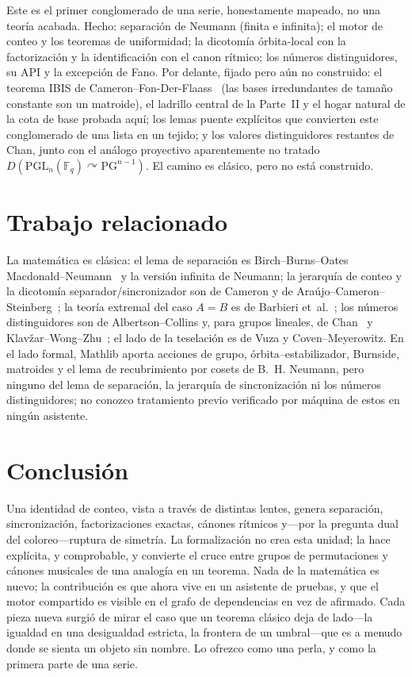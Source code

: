 \documentclass[11pt]{article}
\begin{document}
Este es el primer conglomerado de una serie, honestamente mapeado, no una teoría
acabada. Hecho: separación de Neumann (finita e infinita); el motor de conteo y los
teoremas de uniformidad; la dicotomía órbita-local con la factorización y la
identificación con el canon rítmico; los números distinguidores, su API y la excepción
de Fano. Por delante, fijado pero aún no construido: el teorema IBIS de
Cameron--Fon-Der-Flaass~\cite{CFF1995} (las bases irredundantes de tamaño constante son
un matroide), el ladrillo central de la Parte~II y el hogar natural de la cota de base
probada aquí; los lemas puente explícitos que convierten este conglomerado de una lista
en un tejido; y los valores distinguidores restantes de Chan, junto con el análogo
proyectivo aparentemente no tratado $D(\mathrm{PGL}_n(\mathbb{F}_q)\curvearrowright
\mathrm{PG}^{n-1})$. El camino es clásico, pero no está construido.

\section{Trabajo relacionado}
\label{sec:related}

La matemática es clásica: el lema de separación es Birch--Burns--Oates
Macdonald--Neumann~\cite{BBMN1976} y la versión infinita de Neumann; la jerarquía de
conteo y la dicotomía separador/sincronizador son de Cameron y de
Araújo--Cameron--Steinberg~\cite{ACS2017}; la teoría extremal del caso $A=B$ es de
Barbieri et~al.~\cite{Barbieri2025}; los números distinguidores son de
Albertson--Collins y, para grupos lineales, de Chan~\cite{Chan2006} y
Klavžar--Wong--Zhu~\cite{KWZ2006}; el lado de la teselación es de Vuza y
Coven--Meyerowitz. En el lado formal, Mathlib aporta acciones de grupo,
órbita--estabilizador, Burnside, matroides y el lema de recubrimiento por cosets de
B.~H. Neumann, pero ninguno del lema de separación, la jerarquía de sincronización ni
los números distinguidores; no conozco tratamiento previo verificado por máquina de
estos en ningún asistente.

\section{Conclusión}

Una identidad de conteo, vista a través de distintas lentes, genera separación,
sincronización, factorizaciones exactas, cánones rítmicos y---por la pregunta dual del
coloreo---ruptura de simetría. La formalización no crea esta unidad; la hace explícita,
y comprobable, y convierte el cruce entre grupos de permutaciones y cánones musicales
de una analogía en un teorema. Nada de la matemática es nuevo; la contribución es que
ahora vive en un asistente de pruebas, y que el motor compartido es visible en el grafo
de dependencias en vez de afirmado. Cada pieza nueva surgió de mirar el caso que un
teorema clásico deja de lado---la igualdad en una desigualdad estricta, la frontera de
un umbral---que es a menudo donde se sienta un objeto sin nombre. Lo ofrezco como una
perla, y como la primera parte de una serie.
\end{document}
